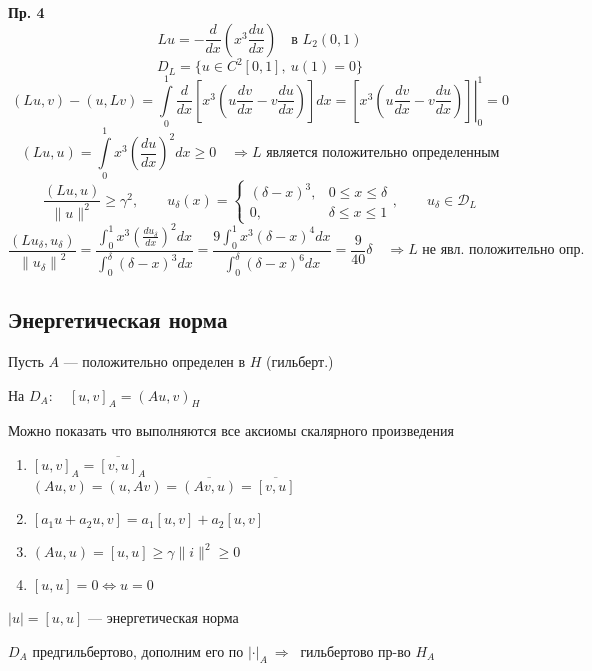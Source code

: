 \documentclass[12pt, a4paper]{article}
\begin{document}
\textbf{Пр. 4}
\[ Lu = - \frac{d }{ d x } \left(x^3 \frac{du}{dx}\right) \quad \text{в } L_2 (0,1) \]
\[ D_L = \{u \in C^2[0,1], \ u(1) = 0 \} \]
\[(Lu, v) - (u, Lv) = \int\limits_{0}^{1} \frac{d}{dx} \left[ x^3 \left(u \frac{dv }{dx } - v \frac{du }{dx } \right)  \right] dx = \left. \left[ x^3 \left(u \frac{dv }{dx } - v \frac{du }{dx } \right) \right] \right|_0^1 = 0\]
\[ (Lu, u) = \int\limits_{0}^{1} x^3 {\left(\frac{du }{dx }\right)}^2 dx \geq 0 \quad \Rightarrow L \text{ является положительно определенным} \]
\[ \frac{(Lu, u)}{\|u\|^2} \geq \gamma^2, \qquad u_\delta (x) = \begin{cases}
	(\delta - x)^3, & 0 \leq x \leq \delta \\
	0, & \delta \leq x \leq 1
\end{cases}, \qquad u_\delta \in \mathcal{D}_L  \]
\[ \frac{(Lu_\delta , u_\delta)}{{\|u_\delta\|}^2}  = \frac{\int_{0}^{1} x^3 {(\frac{du_\delta}{dx})}^2 dx}{\int_{0}^{\delta} {(\delta -x)}^3 dx} = \frac{9 \int_{0}^{1} x^3 {(\delta -x)}^4 dx}{\int_{0}^{\delta} {(\delta -x)}^6 dx} = \frac{9}{40} \delta \quad \Rightarrow L \text{ не явл. положительно опр.} \]

\newpage

\subsection{Энергетическая норма}

Пусть $A$ --- положительно определен в $H$ (гильберт.)

На $D_A: \quad {[u, v]}_A = {(A u, v)}_H$

Можно показать что выполняются все аксиомы скалярного произведения

\begin{enumerate}
	\item $ {[u, v]}_A = \overline{[v, u]}_A $ \\
		  $ (Au, v) = (u, Av) = \overline{(Av, u)} = \overline{[v, u]} $
	\item $ [a_1 u + a_2 u, v] = a_1[u, v] + a_2[u, v]$
	\item $ (Au, u) = [u, u] \geq \gamma \|i\|^2 \geq 0 $
	\item $ [u, u] = 0 \Leftrightarrow u = 0 $
\end{enumerate}

$ |u| = [u, u] $ --- энергетическая норма

$ D_A $ предгильбертово, дополним его по $ {|\boldsymbol{\cdot}|}_A \ \Rightarrow \ $ гильбертово пр-во $ H_A $
\end{document}
